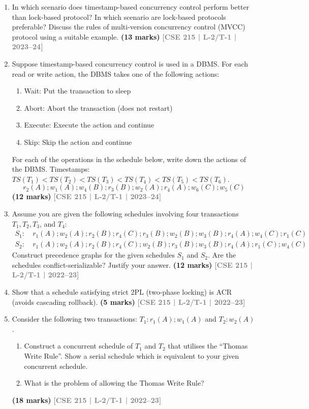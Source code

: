 \documentclass[12pt]{article}
\newcommand{\yr}[1]{\hfill\textcolor{gray}{\small\textbf{[#1]}}}
\newcommand{\mk}[1]{\textcolor{orange!70!black}{\small\textbf{(#1 marks)}}}
\begin{document}
\begin{enumerate}
\item In which scenario does timestamp-based concurrency control perform better than lock-based protocol? In which scenario are lock-based protocols preferable? Discuss the rules of multi-version concurrency control (MVCC) protocol using a suitable example.
\mk{13} \yr{CSE 215 | L-2/T-1 | 2023--24}


\item Suppose timestamp-based concurrency control is used in a DBMS. For each read or write action, the DBMS takes one of the following actions:
\begin{enumerate}
\item Wait: Put the transaction to sleep 
\item Abort: Abort the transaction (does not restart)
\item Execute: Execute the action and continue
\item Skip: Skip the action and continue
\end{enumerate}
For each of the operations in the schedule below, write down the actions of the DBMS. Timestamps: $TS(T_1) < TS(T_2) < TS(T_3) < TS(T_4) < TS(T_5) < TS(T_6)$.
\[r_2(A); w_1(A); w_4(B); r_3(B); w_2(A); r_4(A); w_6(C); w_5(C)\]
\mk{12} \yr{CSE 215 | L-2/T-1 | 2023--24}


\item Assume you are given the following schedules involving four transactions $T_1, T_2, T_3$, and $T_4$:
\begin{align*}
S_1\colon &\ r_1(A); w_2(A); r_2(B); r_4(C); r_3(B); w_2(B); w_3(B); r_4(A); w_4(C); r_1(C)\\
S_2\colon &\ r_1(A); w_2(A); r_2(B); r_4(C); w_2(B); r_3(B); w_3(B); r_4(A); r_1(C); w_4(C)
\end{align*}
Construct precedence graphs for the given schedules $S_1$ and $S_2$. Are the schedules conflict-serializable? Justify your answer.
\mk{12} \yr{CSE 215 | L-2/T-1 | 2022--23}


\item Show that a schedule satisfying strict 2PL (two-phase locking) is ACR (avoids cascading rollback).
\mk{5} \yr{CSE 215 | L-2/T-1 | 2022--23}


\item Consider the following two transactions: $T_1\colon r_1(A); w_1(A)$ and $T_2\colon w_2(A)$.
\begin{enumerate}
  \item Construct a concurrent schedule of $T_1$ and $T_2$ that utilises the ``Thomas Write Rule''. Show a serial schedule which is equivalent to your given concurrent schedule.
  \item What is the problem of allowing the Thomas Write Rule?
\end{enumerate}
\mk{18} \yr{CSE 215 | L-2/T-1 | 2022--23}



\end{enumerate}
\end{document}
